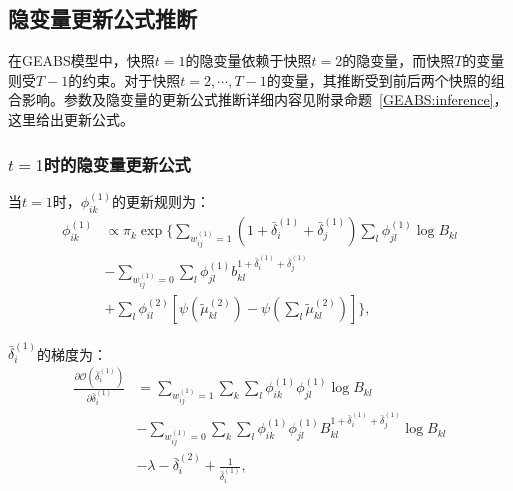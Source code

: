 \subsection{隐变量更新公式推断}

在GEABS模型中，快照$t=1$的隐变量依赖于快照$t=2$的隐变量，而快照$T$的变量则受$T-1$的约束。对于快照$t=2, \cdots, T-1$的变量，其推断受到前后两个快照的组合影响。参数及隐变量的更新公式推断详细内容见附录命题~\ref{GEABS:inference}，这里给出更新公式。
\subsubsection{$t=1$时的隐变量更新公式}
当$t=1$时，$\phi_{ik}^{(1)}$的更新规则为：
\begin{equation}
\begin{split}
\phi _{ik}^{(1)} & \propto \pi_k \exp\{ \sum_{w_{ij}^{(1)}=1} (1+\bar{\delta}_i^{(1)}+\bar{\delta}_j^{(1)}) \sum_l \phi_{jl}^{(1)} \log B_{kl} \\
& -\sum_{w_{ij}^{(1)}=0} \sum_l \phi_{jl}^{(1)}  b_{kl}^{1+\bar{\delta}_i^{(1)}+\bar{\delta}_j^{(1)}} \\
& + \sum_l \phi_{il}^{(2)}[\psi(\tilde{\mu}_{kl}^{(2)}) - \psi(\sum_l \tilde{\mu}_{kl}^{(2)})] \},
\end{split}
\end{equation}

$\bar{\delta}_i^{(1)}$的梯度为：
\begin{equation}
\begin{split}
\frac{\partial \mathscr{O}(\bar{\delta}_i^{(1)})}{\partial \bar{\delta}_i^{(1)}} & =\sum_{w_{ij}^{(1)}=1} \sum_k \sum_l \phi_{ik}^{(1)}\phi_{jl}^{(1)} \log B_{kl} \\
& -\sum_{w_{ij}^{(1)}=0} \sum_k \sum_l \phi_{ik}^{(1)}\phi_{jl}^{(1)}  B_{kl}^{1+\bar{\delta}_i^{(1)}+\bar{\delta}_j^{(1)}} \log B_{kl} \\
& -\lambda - \bar{\delta}_i^{(2)} + \frac{1}{\bar{\delta}_i^{(1)}},
\end{split}
\label{eq:delta1}
\end{equation}

